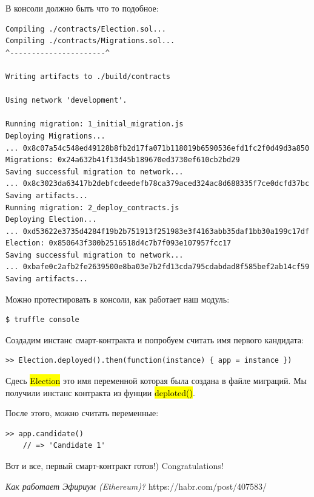 \documentclass{article}
\begin{document}
В консоли должно быть что то подобное:

\begin{lstlisting}
Compiling ./contracts/Election.sol...
Compiling ./contracts/Migrations.sol...
^----------------------^

Writing artifacts to ./build/contracts

Using network 'development'.

Running migration: 1_initial_migration.js
Deploying Migrations...
... 0x8c07a54c548ed49128b8fb2d17fa071b118019b6590536efd1fc2f0d49d3a850
Migrations: 0x24a632b41f13d45b189670ed3730ef610cb2bd29
Saving successful migration to network...
... 0x8c3023da63417b2debfcdeedefb78ca379aced324ac8d688335f7ce0dcfd37bc
Saving artifacts...
Running migration: 2_deploy_contracts.js
Deploying Election...
... 0xd53622e3735d4284f19b2b751913f251983e3f4163abb35daf1bb30a199c17df
Election: 0x850643f300b2516518d4c7b7f093e107957fcc17
Saving successful migration to network...
... 0xbafe0c2afb2fe2639500e8ba03e7b2fd13cda795cdabdad8f585bef2ab14cf59
Saving artifacts...
\end{lstlisting}

Можно протестировать в консоли, как работает наш модуль:


\begin{lstlisting}
$ truffle console
\end{lstlisting}

Создадим инстанс смарт-контракта и попробуем считать имя первого кандидата:

\begin{lstlisting}
>> Election.deployed().then(function(instance) { app = instance })
\end{lstlisting}

Сдесь \hl{Election} это имя переменной которая была создана в файле миграций.
Мы получили инстанс контракта из фунции \hl{deploted()}.

После этого, можно считать переменные:

\begin{lstlisting}
>> app.candidate()
	// => 'Candidate 1'
\end{lstlisting}


Вот и все, первый смарт-контракт готов!) Congratulations!



\begin{thebibliography}{9}

	  \emph{Как работает Эфириум (Ethereum)?}
	  https://habr.com/post/407583/

\end{thebibliography}
\end{document}
